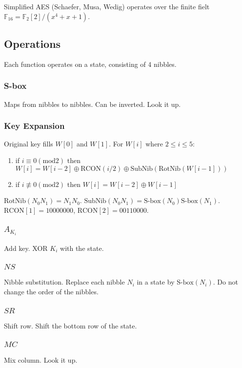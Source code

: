 \documentclass{article}
\begin{document}
Simplified AES (Schaefer, Musa, Wedig) operates over the finite fielt
$\mathbb{F}_16 = \mathbb{F}_2[2]/(x^4+x+1)$.

\subsection{Operations}
Each function operates on a state, consisting of 4 nibbles.

\subsubsection{S-box}
Maps from nibbles to nibbles. Can be inverted. Look it up.

\subsubsection{Key Expansion}
Original key fills $W[0]$ and $W[1]$. For $W[i]$ where $2 \leq i \leq 5$:

\begin{enumerate}
  \item if $i \equiv 0 (\text{mod} 2)$ then
    $W[i]=W[i-2]\oplus\text{RCON}(i/2)\oplus\text{SubNib}(\text{RotNib}(W[i-1]))$
  \item if $i \not\equiv 0 (\text{mod} 2)$ then $W[i]=W[i-2]\oplus W[i-1]$
\end{enumerate}

$\text{RotNib}(N_0N_1) = N_1N_0$.
$\text{SubNib}(N_0N_1) = \text{S-box}(N_0)\text{S-box}(N_1)$.
$\text{RCON}[1]=10000000$, $\text{RCON}[2]=00110000$.

\subsubsection{$A_{K_i}$}
Add key. XOR $K_i$ with the state.

\subsubsection{$NS$}
Nibble substitution. Replace each nibble $N_i$ in a state by
$\text{S-box}(N_i)$. Do not change the order of the nibbles.

\subsubsection{$SR$}
Shift row. Shift the bottom row of the state.

\subsubsection{$MC$}
Mix column. Look it up.
\end{document}
